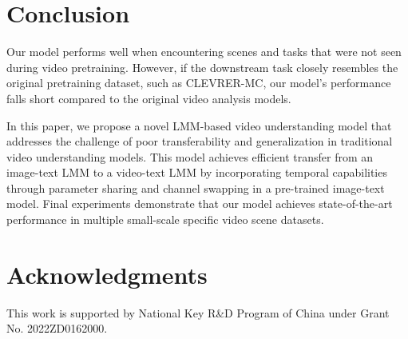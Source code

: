 \section{Conclusion}
Our model performs well when encountering scenes and tasks that were not seen during video pretraining. However, if the downstream task closely resembles the original pretraining dataset, such as CLEVRER-MC, our model's performance falls short compared to the original video analysis models.

In this paper, we propose a novel LMM-based video understanding model that addresses the challenge of poor transferability and generalization in traditional video understanding models. This model achieves efficient transfer from an image-text LMM to a video-text LMM by incorporating temporal capabilities through parameter sharing and channel swapping in a pre-trained image-text model. Final experiments demonstrate that our model achieves state-of-the-art performance in multiple small-scale specific video scene datasets.

\section*{Acknowledgments}
This work is supported by National Key R\&D Program of China under Grant No. 2022ZD0162000.